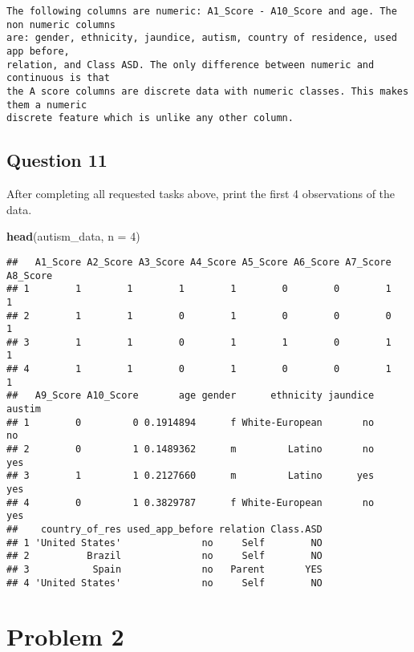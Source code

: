 \documentclass[
]{article}
\newenvironment{Shaded}{\begin{snugshade}}{\end{snugshade}}
\newcommand{\AttributeTok}[1]{\textcolor[rgb]{0.13,0.29,0.53}{#1}}
\newcommand{\DecValTok}[1]{\textcolor[rgb]{0.00,0.00,0.81}{#1}}
\newcommand{\FunctionTok}[1]{\textcolor[rgb]{0.13,0.29,0.53}{\textbf{#1}}}
\newcommand{\NormalTok}[1]{#1}
\begin{document}
\begin{verbatim}
The following columns are numeric: A1_Score - A10_Score and age. The non numeric columns
are: gender, ethnicity, jaundice, autism, country of residence, used app before,
relation, and Class ASD. The only difference between numeric and continuous is that
the A score columns are discrete data with numeric classes. This makes them a numeric
discrete feature which is unlike any other column.
\end{verbatim}

\subsection{Question 11}\label{question-11}

After completing all requested tasks above, print the first 4
observations of the data.

\begin{Shaded}
\begin{Highlighting}[]
\FunctionTok{head}\NormalTok{(autism\_data, }\AttributeTok{n =} \DecValTok{4}\NormalTok{)}
\end{Highlighting}
\end{Shaded}

\begin{verbatim}
##   A1_Score A2_Score A3_Score A4_Score A5_Score A6_Score A7_Score A8_Score
## 1        1        1        1        1        0        0        1        1
## 2        1        1        0        1        0        0        0        1
## 3        1        1        0        1        1        0        1        1
## 4        1        1        0        1        0        0        1        1
##   A9_Score A10_Score       age gender      ethnicity jaundice austim
## 1        0         0 0.1914894      f White-European       no     no
## 2        0         1 0.1489362      m         Latino       no    yes
## 3        1         1 0.2127660      m         Latino      yes    yes
## 4        0         1 0.3829787      f White-European       no    yes
##    country_of_res used_app_before relation Class.ASD
## 1 'United States'              no     Self        NO
## 2          Brazil              no     Self        NO
## 3           Spain              no   Parent       YES
## 4 'United States'              no     Self        NO
\end{verbatim}

\section{Problem 2}\label{problem-2}
\end{document}

